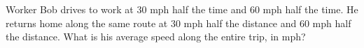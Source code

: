 Worker Bob drives to work at $30$ mph half the time and $60$ mph half the time. He returns home along the same route at $30$ mph half the distance and $60$ mph half the distance. What is his average speed along the entire trip, in  mph?
